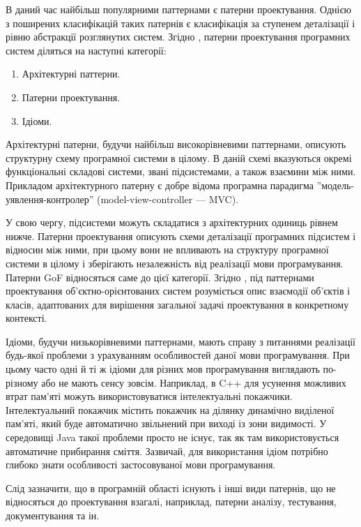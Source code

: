 \documentclass[../main.tex]{subfiles}
\begin{document}
В даний час найбільш популярними паттернами є патерни проектування. Однією з поширених класифікацій таких патернів є класифікація за ступенем деталізації і рівню абстракції розглянутих систем. Згідно \cite{pattern_oriented_arch}, патерни проектування програмних систем діляться на наступні категорії:

\begin{enumerate}
	\item Архітектурні паттерни.
	\item Патерни проектування.
	\item Ідіоми.
\end{enumerate}

Архітектурні патерни, будучи найбільш високорівневими паттернами, описують структурну схему програмної системи в цілому. В даній схемі вказуються окремі функціональні складові системи, звані підсистемами, а також взаємини між ними. Прикладом архітектурного патерну є добре відома програмна парадигма ''модель-уявлення-контролер'' (model-view-controller — MVC).

У свою чергу, підсистеми можуть складатися з архітектурних одиниць рівнем нижче. Патерни проектування описують схеми деталізації програмних підсистем і відносин між ними, при цьому вони не впливають на структуру програмної системи в цілому і зберігають незалежність від реалізації мови програмування. Патерни GoF відносяться саме до цієї категорії. Згідно \cite{gof}, під паттернами проектування об'єктно-орієнтованих систем розуміється опис взаємодії об'єктів і класів, адаптованих для вирішення загальної задачі проектування в конкретному контексті.

Ідіоми, будучи низькорівневими паттернами, мають справу з питаннями реалізації будь-якої проблеми з урахуванням особливостей даної мови програмування. При цьому часто одні й ті ж ідіоми для різних мов програмування виглядають по-різному або не мають сенсу зовсім. Наприклад, в C++ для усунення можливих втрат пам'яті можуть використовуватися інтелектуальні покажчики. Інтелектуальний покажчик містить покажчик на ділянку динамічно виділеної пам'яті, який буде автоматично звільнений при виході із зони видимості. У середовищі Java такої проблеми просто не існує, так як там використовується автоматичне прибирання сміття. Зазвичай, для використання ідіом потрібно глибоко знати особливості застосовуваної мови програмування.

Слід зазначити, що в програмній області існують і інші види патернів, що не відносяться до проектування взагалі, наприклад, патерни аналізу, тестування, документування та ін.
\end{document}
